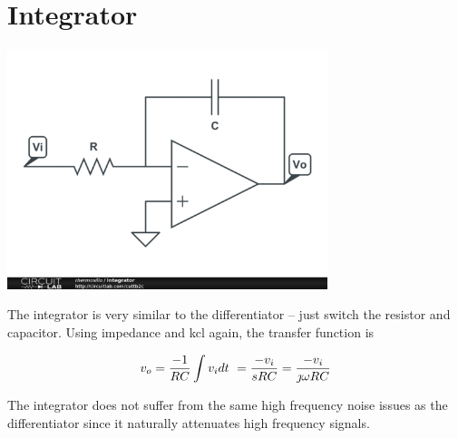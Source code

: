 \section{Integrator}
\begin{center}
	\includegraphics[width=0.70\textwidth]{schematics/integrator.PNG}
\end{center}
The integrator is very similar to the differentiator -- just switch the resistor and capacitor. Using impedance and \ac{kcl} again, the transfer function is

\textcolor{red}{
\begin{equation}
\vout = \frac{-1}{RC}\int \vin dt\ = \frac{-\vin}{sRC} = \frac{-\vin}{\jmath \omega RC}
\label{eq:integrator}
\end{equation}
}

The integrator does not suffer from the same high frequency noise issues as the differentiator since it naturally attenuates high frequency signals.

